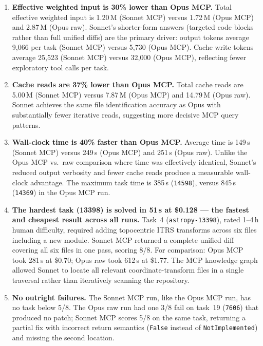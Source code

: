 \begin{enumerate}
\item \textbf{Effective weighted input is 30\% lower than Opus MCP.}
      Total effective weighted input is 1.20\,M (Sonnet MCP) versus
      1.72\,M (Opus MCP) and 2.87\,M (Opus raw).  Sonnet's
      shorter-form answers (targeted code blocks rather than full
      unified diffs) are the primary driver: output tokens average
      9{,}066 per task (Sonnet MCP) versus 5{,}730 (Opus MCP).
      Cache write tokens average 25{,}523 (Sonnet MCP) versus
      32{,}000 (Opus MCP), reflecting fewer exploratory tool calls
      per task.

\item \textbf{Cache reads are 37\% lower than Opus MCP.}
      Total cache reads are 5.00\,M (Sonnet MCP) versus 7.87\,M
      (Opus MCP) and 14.79\,M (Opus raw).
      Sonnet achieves the same file identification accuracy as Opus
      with substantially fewer iterative reads, suggesting more
      decisive MCP query patterns.

\item \textbf{Wall-clock time is 40\% faster than Opus MCP.}
      Average time is 149\,s (Sonnet MCP) versus 249\,s (Opus MCP)
      and 251\,s (Opus raw).
      Unlike the Opus MCP vs.\ raw comparison where time was
      effectively identical, Sonnet's reduced output verbosity
      and fewer cache reads produce a measurable wall-clock
      advantage.  The maximum task time is 385\,s (\texttt{14598}),
      versus 845\,s (\texttt{14369}) in the Opus MCP run.

\item \textbf{The hardest task (13398) is solved in 51\,s at
      \$0.128 --- the fastest and cheapest result across all runs.}
      Task~4 (\texttt{astropy-13398}), rated 1--4\,h human
      difficulty, required adding topocentric ITRS transforms across
      six files including a new module.  Sonnet MCP returned a
      complete unified diff covering all six files in one pass,
      scoring 8/8.  For comparison: Opus MCP took 281\,s at \$0.70;
      Opus raw took 612\,s at \$1.77.  The MCP knowledge graph
      allowed Sonnet to locate all relevant coordinate-transform
      files in a single traversal rather than iteratively scanning
      the repository.

\item \textbf{No outright failures.}
      The Sonnet MCP run, like the Opus MCP run, has no task below
      5/8.  The Opus raw run had one 3/8 fail on task~19
      (\texttt{7606}) that produced no patch; Sonnet MCP scores
      5/8 on the same task, returning a partial fix with incorrect
      return semantics (\texttt{False} instead of
      \texttt{NotImplemented}) and missing the second location.


\end{enumerate}
